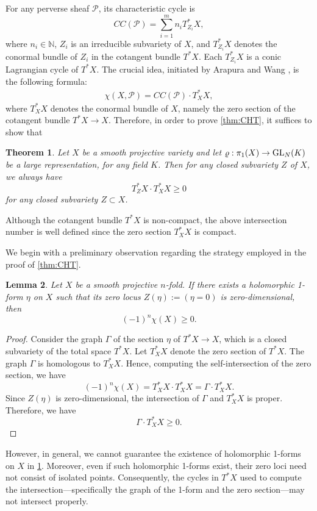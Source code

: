\documentclass[english]{amsproc}
\theoremstyle{plain}
\newtheorem{thm}{Theorem}[section]
\newtheorem{lem}[thm]{Lemma}
\theoremstyle{definition}
\theoremstyle{remark}
\theoremstyle{plain}
\numberwithin{equation}{thm} %
\newcommand{\cP}{\mathcal P}
\newcommand{\bN}{\mathbb{N}}
\newcommand{\GL}{{\rm GL}}
\begin{document}
	For any perverse sheaf $\cP$, its characteristic cycle is 
	$$
	CC(\cP)=\sum_{i=1}^{m}n_i T_{Z_i}^*X,
	$$ 
	where $n_i\in \bN$, $Z_i$ is an irreducible subvariety of $X$, and \(T^{*}_{Z_i}X\) denotes the conormal bundle of \(Z_i\) in the cotangent bundle \(T^{*}X\).
	Each \(T^{*}_{Z_i}X\) is a conic Lagrangian cycle of \(T^{*}X\).
	The crucial idea, initiated by Arapura and Wang \cite{AW25}, is the following formula:
	\begin{align}
		\chi(X,\cP)=CC(\cP)\cdot  T_X^*X,
	\end{align}
	where \(T_X^*X\) denotes the conormal bundle of \(X\), namely the zero section of the cotangent 
	bundle \(T^*X \to X\). 
	Therefore, in order to prove \cref{thm:CHT}, it suffices to show that
	\begin{thm}\label{thm:CHT2}
Let $X$ be a smooth projective variety and let $\varrho:\pi_1(X)\to \GL_{N}(K)$ be a large representation, for any field $K$. Then for any closed subvariety $Z$ of $X$, we always have  		 	\[
		 T_Z^*X \cdot T_X^*X \ge 0
		 \]
		 for any closed subvariety \(Z \subset X\).
	\end{thm} 
	Although the cotangent bundle \(T^*X\) is non-compact, the above intersection number is 
	well defined since the zero section \(T_X^*X\) is compact. 
	
	We begin with a preliminary observation regarding the strategy employed in the proof of \cref{thm:CHT}. 
\begin{lem}\label{lem:baby}
	Let $X$ be a smooth projective $n$-fold. If there exists a holomorphic 1-form $\eta$ on $X$ such that its zero locus $Z(\eta) := (\eta=0)$ is zero-dimensional, then
	$$
	(-1)^n\chi(X)   \geq 0.
	$$
\end{lem} 
\begin{proof}
	Consider the graph $\Gamma$ of the section $\eta$ of $T^*X \to X$, which is a closed subvariety of the total space $T^*X$. Let $T_X^*X$ denote the zero section of $T^*X$. The graph $\Gamma$ is homologous to $T_X^*X$. Hence, computing the self-intersection of the zero section, we have
	$$
	(-1)^n\chi(X) = T_X^*X \cdot T_X^*X = \Gamma \cdot T_X^*X.
	$$
	Since $Z(\eta)$ is zero-dimensional, the intersection of $\Gamma$ and $T_X^*X$ is proper.  Therefore, we have
	 \[
	\Gamma \cdot T_X^*X \geq 0.
	\]
\end{proof}
However, in general, we cannot guarantee the existence of holomorphic 1-forms on $X$  in \cref{thm:CHT2}. Moreover, even if such holomorphic 1-forms exist, their zero loci need not consist of isolated points. Consequently, the cycles in $T^*X$ used to compute the intersection—specifically the graph of the   1-form and the zero section—may not intersect properly.
\end{document}
